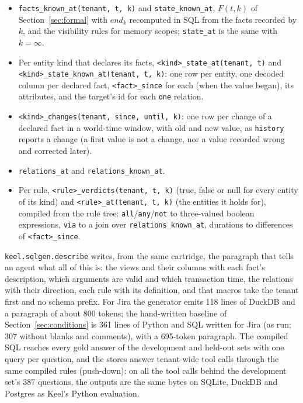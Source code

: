 \documentclass[sigconf, nonacm]{acmart}
\newcommand{\code}[1]{\texttt{#1}}
\begin{document}
\begin{itemize}[leftmargin=*]
\item \code{facts\_known\_at(tenant, t, k)} and \code{state\_known\_at}, $F(t, k)$ of Section~\ref{sec:formal} with $\mathit{end}_k$ recomputed in SQL from the facts recorded by $k$, and the visibility rules for memory scopes; \code{state\_at} is the same with $k = \infty$.
\item Per entity kind that declares its facts, \code{<kind>\_state\_at(tenant, t)} and \code{<kind>\_state\_known\_at(tenant, t, k)}: one row per entity, one decoded column per declared fact, \code{<fact>\_since} for each (when the value began), its attributes, and the target's id for each \code{one} relation.
\item \code{<kind>\_changes(tenant, since, until, k)}: one row per change of a declared fact in a world-time window, with old and new value, as \code{history} reports a change (a first value is not a change, nor a value recorded wrong and corrected later).
\item \code{relations\_at} and \code{relations\_known\_at}.
\item Per rule, \code{<rule>\_verdicts(tenant, t, k)} (true, false or null for every entity of its kind) and \code{<rule>\_at(tenant, t, k)} (the entities it holds for), compiled from the rule tree: \code{all}/\code{any}/\code{not} to three-valued boolean expressions, \code{via} to a join over \code{relations\_known\_at}, durations to differences of \code{<fact>\_since}.
\end{itemize}

\code{keel.sqlgen.describe} writes, from the same cartridge, the paragraph that tells an agent what all of this is: the views and their columns with each fact's description, which arguments are valid and which transaction time, the relations with their direction, each rule with its definition, and that macros take the tenant first and no schema prefix. For Jira the generator emits 118 lines of DuckDB and a paragraph of about 800 tokens; the hand-written baseline of Section~\ref{sec:conditions} is 361 lines of Python and SQL written for Jira (as run; 307 without blanks and comments), with a 695-token paragraph. The compiled SQL reaches every gold answer of the development and held-out sets with one query per question, and the stores answer tenant-wide tool calls through the same compiled rules (push-down): on all the tool calls behind the development set's 387 questions, the outputs are the same bytes on SQLite, DuckDB and Postgres as Keel's Python evaluation.
\end{document}

